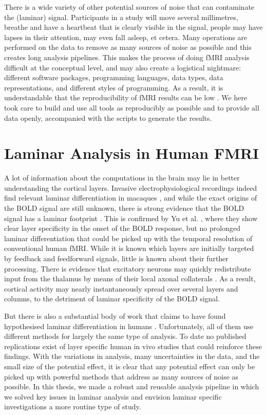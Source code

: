 There is a wide variety of other potential sources of noise that can contaminate the (laminar) signal. Participants in a study will move several millimetres, breathe and have a heartbeat that is clearly visible in the signal, people may have lapses in their attention, may even fall asleep, et cetera. Many operations are performed on the data to remove as many sources of noise as possible and this creates long analysis pipelines. This makes the process of doing fMRI analysis difficult at the conceptual level, and may also create a logistical nightmare: different software packages, programming languages, data types, data representations, and different styles of programming. As a result, it is understandable that the reproducibility of fMRI results can be low \cite{Nosek2015,Gorgolewski2016a}. We here took care to build and use all tools as reproducibly as possible and to provide all data openly, accompanied with the scripts to generate the results.

\section{Laminar Analysis in Human FMRI}
A lot of information about the computations in the brain may lie in better understanding the cortical layers. Invasive electrophysiological recordings indeed find relevant laminar differentiation in macaques \cite{Buffalo2011,Maier2010,Maier2011,VanKerkoerle2017}, and while the exact origins of the BOLD signal are still unknown, there is strong evidence that the BOLD signal has a laminar footprint \cite{Goense2006}. This is confirmed by Yu et al. \cite{Yu2014}, where they show clear layer specificity in the onset of the BOLD response, but no prolonged laminar differentiation that could be picked up with the temporal resolution of conventional human fMRI. While it is known which layers are initially targeted by feedback and feedforward signals, little is known about their further processing. There is evidence that excitatory neurons may quickly redistribute input from the thalamus by means of their local axonal collaterals \cite{Guy2017,ReyesPuerta2015}. As a result, cortical activity may nearly instantaneously spread over several layers and columns, to the detriment of laminar specificity of the BOLD signal.

But there is also a substantial body of work that claims to have found hypothesised laminar differentiation in humans \cite{Maass2014,Muckli2015,Kok2016,Huber2017}. Unfortunately, all of them use different methods for largely the same type of analysis. To date no published replications exist of layer specific human in vivo studies that could reinforce these findings. With the variations in analysis, many uncertainties in the data, and the small size of the potential effect, it is clear that any potential effect can only be picked up with powerful methods that address as many sources of noise as possible. In this thesis, we made a robust and reusable analysis pipeline in which we solved key issues in laminar analysis and envision laminar specific investigations a more routine type of study.


